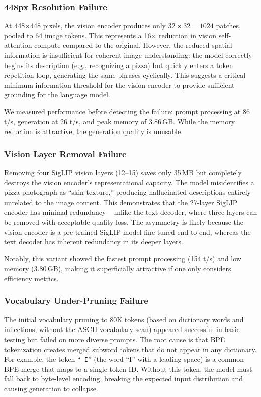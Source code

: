 \documentclass[11pt]{article}
\begin{document}
\subsubsection{448px Resolution Failure}

At 448$\times$448 pixels, the vision encoder produces only $32\times32 = 1024$ patches, pooled to 64 image tokens. This represents a 16$\times$ reduction in vision self-attention compute compared to the original. However, the reduced spatial information is insufficient for coherent image understanding: the model correctly begins its description (e.g., recognizing a pizza) but quickly enters a token repetition loop, generating the same phrases cyclically. This suggests a critical minimum information threshold for the vision encoder to provide sufficient grounding for the language model.

We measured performance before detecting the failure: prompt processing at 86 t/s, generation at 26 t/s, and peak memory of 3.86\,GB. While the memory reduction is attractive, the generation quality is unusable.

\subsubsection{Vision Layer Removal Failure}

Removing four SigLIP vision layers (12--15) saves only 35\,MB but completely destroys the vision encoder's representational capacity. The model misidentifies a pizza photograph as ``skin texture,'' producing hallucinated descriptions entirely unrelated to the image content. This demonstrates that the 27-layer SigLIP encoder has minimal redundancy---unlike the text decoder, where three layers can be removed with acceptable quality loss. The asymmetry is likely because the vision encoder is a pre-trained SigLIP model fine-tuned end-to-end, whereas the text decoder has inherent redundancy in its deeper layers.

Notably, this variant showed the fastest prompt processing (154 t/s) and low memory (3.80\,GB), making it superficially attractive if one only considers efficiency metrics.

\subsubsection{Vocabulary Under-Pruning Failure}

The initial vocabulary pruning to 80K tokens (based on dictionary words and inflections, without the ASCII vocabulary scan) appeared successful in basic testing but failed on more diverse prompts. The root cause is that BPE tokenization creates merged subword tokens that do not appear in any dictionary. For example, the token ``\texttt{\_I}'' (the word ``I'' with a leading space) is a common BPE merge that maps to a single token ID. Without this token, the model must fall back to byte-level encoding, breaking the expected input distribution and causing generation to collapse.
\end{document}
